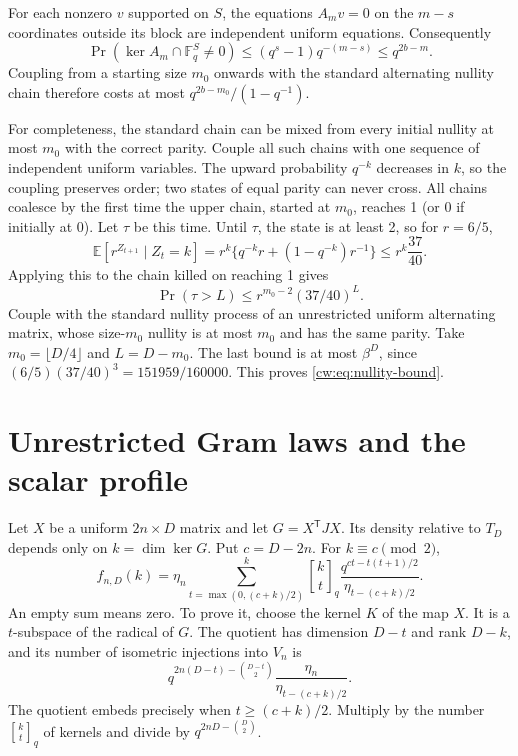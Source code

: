 \documentclass[11pt,letterpaper]{article}
\newcommand{\qbinom}[2]{\genfrac{[}{]}{0pt}{}{#1}{#2}_q}
\begin{document}
For each nonzero $v$ supported on $S$, the equations $A_m v=0$ on the
$m-s$ coordinates outside its block are independent uniform equations.
Consequently
\[
 \Pr(\ker A_m\cap\mathbb F_q^S\ne0)
 \le(q^s-1)q^{-(m-s)}\le q^{2b-m}.
\]
Coupling from a starting size $m_0$ onwards with the standard alternating
nullity chain therefore costs at most
$q^{2b-m_0}/(1-q^{-1})$.

For completeness, the standard chain can be mixed from every initial
nullity at most $m_0$ with the correct parity. Couple all such chains with
one sequence of independent uniform variables. The upward probability
$q^{-k}$ decreases in $k$, so the coupling preserves order; two states
of equal parity can never cross. All chains coalesce by the first time
the upper chain, started at $m_0$, reaches 1 (or 0 if initially at 0).
Let $\tau$ be this time. Until $\tau$, the state is at least 2, so for
$r=6/5$,
\[
 \mathbb E[r^{Z_{t+1}}\mid Z_t=k]
 =r^k\{q^{-k}r+(1-q^{-k})r^{-1}\}
 \le r^k\frac{37}{40}.
\]
Applying this to the chain killed on reaching 1 gives
\[
 \Pr(\tau>L)\le r^{m_0-2}(37/40)^L.
\]
Couple with the standard nullity process of an unrestricted uniform
alternating matrix, whose size-$m_0$ nullity is at most $m_0$ and has
the same parity. Take $m_0=\lfloor D/4\rfloor$ and $L=D-m_0$.
The last bound is at most $\beta^D$, since
$(6/5)(37/40)^3=151959/160000$. This proves
\eqref{cw:eq:nullity-bound}.

\section{Unrestricted Gram laws and the scalar profile}

Let $X$ be a uniform $2n\times D$ matrix and let
$G=X^{\mathsf T}JX$. Its density relative to $T_D$ depends only on
$k=\dim\ker G$. Put $c=D-2n$. For $k\equiv c\pmod2$,
\begin{equation}\label{cw:eq:likelihood}
 f_{n,D}(k)=\eta_n
  \sum_{t=\max(0,(c+k)/2)}^k
    \qbinom{k}{t}
    \frac{q^{ct-t(t+1)/2}}{\eta_{t-(c+k)/2}}.
\end{equation}
An empty sum means zero. To prove it, choose the kernel $K$ of the map
$X$. It is a $t$-subspace of the radical of $G$. The quotient has
dimension $D-t$ and rank $D-k$, and its number of isometric injections
into $V_n$ is
\[
 q^{2n(D-t)-\binom{D-t}{2}}
 \frac{\eta_n}{\eta_{t-(c+k)/2}}.
\]
The quotient embeds precisely when $t\ge(c+k)/2$. Multiply by the
number $\qbinom{k}{t}$ of kernels and divide by $q^{2nD-\binom D2}$.
\end{document}
